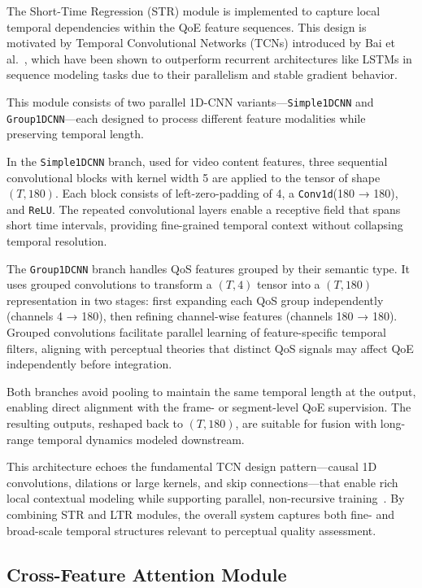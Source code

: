 The Short-Time Regression (STR) module is implemented to capture local temporal dependencies within the QoE feature sequences. This design is motivated by Temporal Convolutional Networks (TCNs) introduced by Bai et al.~\cite{bai2018empirical}, which have been shown to outperform recurrent architectures like LSTMs in sequence modeling tasks due to their parallelism and stable gradient behavior.

This module consists of two parallel 1D-CNN variants—\texttt{Simple1DCNN} and \texttt{Group1DCNN}—each designed to process different feature modalities while preserving temporal length.

In the \texttt{Simple1DCNN} branch, used for video content features, three sequential convolutional blocks with kernel width 5 are applied to the tensor of shape $(T, 180)$. Each block consists of left-zero-padding of 4, a \texttt{Conv1d}(180 → 180), and \texttt{ReLU}. The repeated convolutional layers enable a receptive field that spans short time intervals, providing fine-grained temporal context without collapsing temporal resolution.

The \texttt{Group1DCNN} branch handles QoS features grouped by their semantic type. It uses grouped convolutions to transform a $(T, 4)$ tensor into a $(T, 180)$ representation in two stages: first expanding each QoS group independently (channels 4 → 180), then refining channel-wise features (channels 180 → 180). Grouped convolutions facilitate parallel learning of feature-specific temporal filters, aligning with perceptual theories that distinct QoS signals may affect QoE independently before integration.

Both branches avoid pooling to maintain the same temporal length at the output, enabling direct alignment with the frame- or segment-level QoE supervision. The resulting outputs, reshaped back to $(T, 180)$, are suitable for fusion with long-range temporal dynamics modeled downstream.

This architecture echoes the fundamental TCN design pattern—causal 1D convolutions, dilations or large kernels, and skip connections—that enable rich local contextual modeling while supporting parallel, non-recursive training~\cite{bai2018empirical}. By combining STR and LTR modules, the overall system captures both fine- and broad-scale temporal structures relevant to perceptual quality assessment.

\subsection{Cross-Feature Attention Module}

